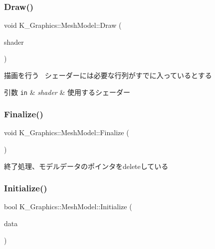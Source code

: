 \subsubsection{\texorpdfstring{Draw()}{Draw()}}
{\footnotesize\ttfamily void K\+\_\+\+Graphics\+::\+Mesh\+Model\+::\+Draw (\begin{DoxyParamCaption}\item[{\mbox{\hyperlink{class_k___graphics_1_1_shader_class}{Shader\+Class}} $\ast$}]{shader }\end{DoxyParamCaption})}



描画を行う~\newline
シェーダーには必要な行列がすでに入っているとする 


\begin{DoxyParams}[1]{引数}
\mbox{\tt in}  & {\em shader} & 使用するシェーダー \\
\hline
\end{DoxyParams}
\mbox{\label{class_k___graphics_1_1_mesh_model_a22ec15af1fc136d17ef87293acc1e4a7}} 
\subsubsection{\texorpdfstring{Finalize()}{Finalize()}}
{\footnotesize\ttfamily void K\+\_\+\+Graphics\+::\+Mesh\+Model\+::\+Finalize (\begin{DoxyParamCaption}{ }\end{DoxyParamCaption})}



終了処理、モデルデータのポインタをdeleteしている 

\mbox{\label{class_k___graphics_1_1_mesh_model_a637186b0c2c238605024c1ac04b74fa5}} 
\subsubsection{\texorpdfstring{Initialize()}{Initialize()}}
{\footnotesize\ttfamily bool K\+\_\+\+Graphics\+::\+Mesh\+Model\+::\+Initialize (\begin{DoxyParamCaption}\item[{\mbox{\hyperlink{struct_k___graphics_1_1_model_datas}{Model\+Datas}} $\ast$}]{data }\end{DoxyParamCaption})}



